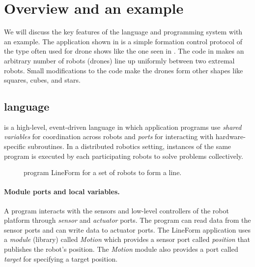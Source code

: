 \section{Overview and an example}
\label{sec:overview}

\newcommand{\LineForm}{\textsf{LineForm}\xspace}

We will discuss the key features of the \lgname language and programming system with an example.
The \lgname application shown in  is a simple formation control protocol of the type often used for drone shows like the one seen in .
The code in  makes an arbitrary number of robots (drones) line up uniformly between two extremal robots.
Small modifications to the code make the drones form other shapes like squares, cubes, and stars.

\subsection{\lgname language}
\label{sec:koord-language}
\lgname is a high-level, event-driven language in which application programs use \emph{shared variables} for coordination across robots
and \emph{ports} for interacting with hardware-specific subroutines.
In a distributed robotics setting, instances of the same \lgname program is executed by each participating robots to solve problems collectively.

\begin{figure}[h!]
    {
        
    }
    {
        
    }
    \caption{\lgname program \LineForm for a set of robots to form a line.}
    \label{fig:lineform}
\end{figure}

\paragraph{Module ports and local variables.}
A \lgname program interacts with the sensors and low-level controllers of the robot platform through \emph{sensor} and \emph{actuator} ports.
The program can read data from the sensor ports and can write data to actuator ports.
%
The \LineForm application uses a \emph{module} (library) called \emph{Motion} which provides a sensor port called \emph{position} that publishes the robot's position.
The \emph{Motion} module also provides a port called \emph{target} for specifying a target position.

